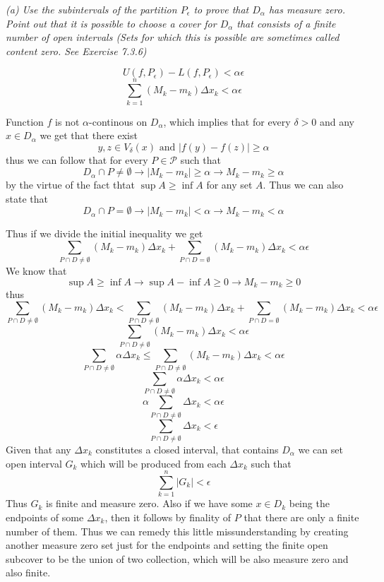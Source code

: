 \documentclass[11pt,oneside,titlepage]{book}
\begin{document}
\textit{(a) Use the subintervals of the partition $P_\epsilon$ to prove that
  $D_\alpha$ has measure zero. Point out that it is possible to choose a cover
  for $D_\alpha$ that consists of a finite number of open intervals (Sets for
  which this is possible are sometimes called content zero. See Exercise 7.3.6)
}

$$U(f, P_\epsilon) - L(f, P_\epsilon) < \alpha \epsilon$$
$$\sum_{k = 1}^n{(M_k - m_k) \Delta x_k} < \alpha \epsilon$$

Function $f$ is not $\alpha$-continous on $D_\alpha$, which implies that
for every $\delta > 0$ and any $x \in D_\alpha$ we get that there
exist 
$$ y, z \in V_\delta(x) \text{ and } |f(y) - f(z)| \geq \alpha$$
thus we can follow that for every $P \in \mathcal P$ such that
$$D_\alpha \cap P \neq \emptyset \to |M_k - m_k| \geq \alpha \to
M_k - m_k \geq \alpha$$
by the virtue of the fact thtat $\sup A \geq \inf A$ for any set $A$.
Thus we can also state that
$$D_\alpha \cap P = \emptyset \to |M_k - m_k| < \alpha \to
M_k - m_k < \alpha$$

Thus if we divide the initial inequality we get
$$\sum_{P \cap D \neq \emptyset}{(M_k - m_k) \Delta x_k} +
\sum_{P \cap D = \emptyset}{(M_k - m_k) \Delta x_k}
< \alpha \epsilon$$
We know that
$$\sup A \geq \inf A \to \sup A - \inf A \geq 0 \to M_k - m_k \geq 0$$
thus
$$\sum_{P \cap D \neq \emptyset}{(M_k - m_k) \Delta x_k}  < \sum_{P \cap D \neq \emptyset}{(M_k - m_k) \Delta x_k} +
\sum_{P \cap D = \emptyset}{(M_k - m_k) \Delta x_k}
< \alpha \epsilon$$
$$\sum_{P \cap D \neq \emptyset}{(M_k - m_k) \Delta x_k}
< \alpha \epsilon$$
$$
\sum_{P \cap D \neq \emptyset}{\alpha \Delta x_k}
\leq \sum_{P \cap D \neq \emptyset}{(M_k - m_k) \Delta x_k}
< \alpha \epsilon$$
$$
\sum_{P \cap D \neq \emptyset}{\alpha \Delta x_k}
< \alpha \epsilon$$
$$
\alpha \sum_{P \cap D \neq \emptyset}{ \Delta x_k}
< \alpha \epsilon$$
$$ \sum_{P \cap D \neq \emptyset}{ \Delta x_k} <  \epsilon$$
Given that any $\Delta x_k$ constitutes a closed interval, that contains
$D_\alpha$ we can set open interval $G_k$ which will be produced from each
$\Delta x_k$ such that
$$ \sum_{k = 1}^n{ |G_k|} <  \epsilon$$
Thus $G_k$ is finite and measure zero.
Also if we have some $x \in D_k$ being the endpoints of some $\Delta x_k$, then
it follows by finality of $P$ that there are only a finite number of them.
Thus we can remedy this little missunderstanding by creating another
measure zero set just for the endpoints and setting the finite open subcover
to be the union of two collection, which will be also measure zero and also
finite.
\end{document}

